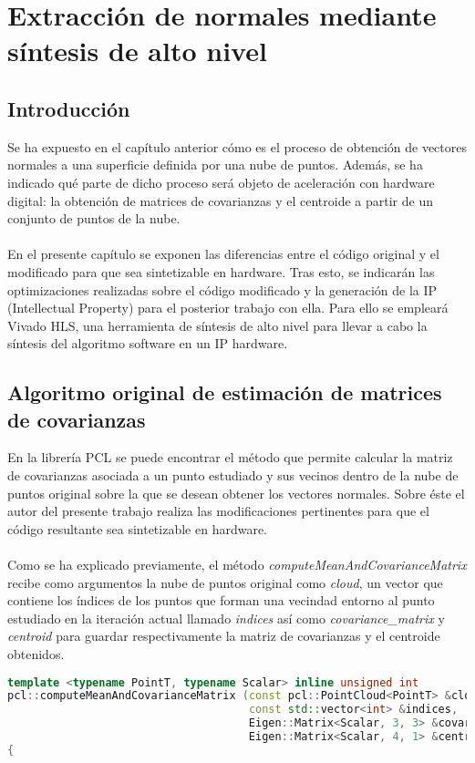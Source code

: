 \chapter{Extracción de normales mediante síntesis de alto nivel}

\section{Introducción}
Se ha expuesto en el capítulo anterior cómo es el proceso de obtención de vectores normales a una superficie definida por una nube de puntos. Además, se ha indicado qué parte de dicho proceso será objeto de aceleración con hardware digital: la obtención de matrices de covarianzas y el centroide a partir de un conjunto de puntos de la nube.
\\
\\
En el presente capítulo se exponen las diferencias entre el código original y el modificado para que sea sintetizable en hardware. Tras esto, se indicarán las optimizaciones realizadas sobre el código modificado y la generación de la IP (Intellectual Property) para el posterior trabajo con ella. Para ello se empleará Vivado HLS, una herramienta de síntesis de alto nivel para llevar a cabo la síntesis del algoritmo software en un IP hardware.


\section{Algoritmo original de estimación de matrices de covarianzas}

En la librería PCL se puede encontrar el método que permite calcular la matriz de covarianzas asociada a un punto estudiado y sus vecinos dentro de la nube de puntos original sobre la que se desean obtener los vectores normales\cite{calculo_covarianzas}. Sobre éste el autor del presente trabajo realiza las modificaciones pertinentes para que el código resultante sea sintetizable en hardware.
\\
\\
Como se ha explicado previamente, el método \textit{computeMeanAndCovarianceMatrix} recibe como argumentos la nube de puntos original como \textit{cloud}, un vector que contiene los índices de los puntos que forman una vecindad entorno al punto estudiado en la iteración actual llamado \textit{indices} así como \textit{covariance\_matrix} y \textit{centroid} para guardar respectivamente la matriz de covarianzas y el centroide obtenidos.

\begin{lstlisting}[language=C++,breaklines]
  template <typename PointT, typename Scalar> inline unsigned int
pcl::computeMeanAndCovarianceMatrix (const pcl::PointCloud<PointT> &cloud,
                                     const std::vector<int> &indices,
                                     Eigen::Matrix<Scalar, 3, 3> &covariance_matrix,
                                     Eigen::Matrix<Scalar, 4, 1> &centroid)
{
\end{lstlisting}

